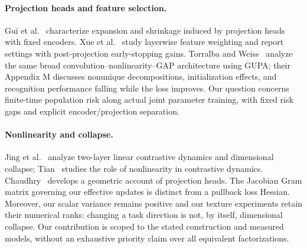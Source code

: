 \paragraph{Projection heads and feature selection.}
Gui et al.~\cite{gui2023projection} characterize expansion and shrinkage induced by projection heads with fixed encoders. Xue et al.~\cite{xue2024benefits} study layerwise feature weighting and report settings with post-projection early-stopping gains. Torralba and Weiss~\cite{torralba2026theory} analyze the same broad convolution--nonlinearity--GAP architecture using GUPA; their Appendix M discusses nonunique decompositions, initialization effects, and recognition performance falling while the loss improves. Our question concerns finite-time population risk along actual joint parameter training, with fixed risk gaps and explicit encoder/projection separation.

\paragraph{Nonlinearity and collapse.}
Jing et al.~\cite{jing2022collapse} analyze two-layer linear contrastive dynamics and dimensional collapse; Tian~\cite{tian2023nonlinearity} studies the role of nonlinearity in contrastive dynamics. Chaudhry~\cite{chaudhry2026geometry} develops a geometric account of projection heads. The Jacobian Gram matrix governing our effective updates is distinct from a pullback loss Hessian. Moreover, our scalar variance remains positive and our texture experiments retain their numerical ranks: changing a task direction is not, by itself, dimensional collapse. Our contribution is scoped to the stated construction and measured models, without an exhaustive priority claim over all equivalent factorizations.
